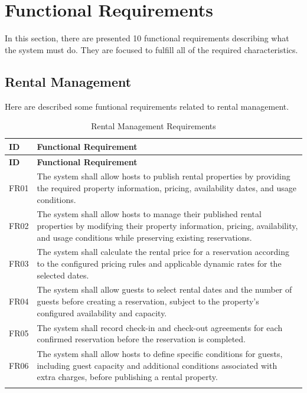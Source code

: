 \section{Functional Requirements}

In this section, there are presented 10 functional requirements describing what the system must do. They are focused 
to fulfill all of the required characteristics. 


\subsection{Rental Management}

Here are described some funtional requirements related to rental management.


\begin{longtable}{|p{}|p{}|}
    \hline
    \textbf{ID} & 
    \textbf{Functional Requirement} \\
    \hline
    \endfirsthead

    \hline
    \textbf{ID} & \textbf{Functional Requirement} \\
    \hline
    \endhead

    FR01 & 
    The system shall allow hosts to publish rental properties by providing the required property information, 
    pricing, availability dates, and usage conditions. \\
    \hline

    FR02 &
    The system shall allow hosts to manage their published rental properties by modifying their property information, 
    pricing, availability, and usage conditions while preserving existing reservations. \\
    \hline

    FR03 &
    The system shall calculate the rental price for a reservation according to the configured pricing rules and 
    applicable dynamic rates for the selected dates. \\
    \hline

    FR04 &
    The system shall allow guests to select rental dates and the number of guests before creating a reservation, 
    subject to the property's configured availability and capacity. \\
    \hline

    FR05 &
    The system shall record check-in and check-out agreements for each confirmed reservation before the reservation 
    is completed. \\
    \hline

    FR06 &
    The system shall allow hosts to define specific conditions for guests, including guest capacity and additional 
    conditions associated with extra charges, before publishing a rental property. \\
    \hline

    \caption{Rental Management Requirements}

    \label{tab:rm_fr}

\end{longtable}


